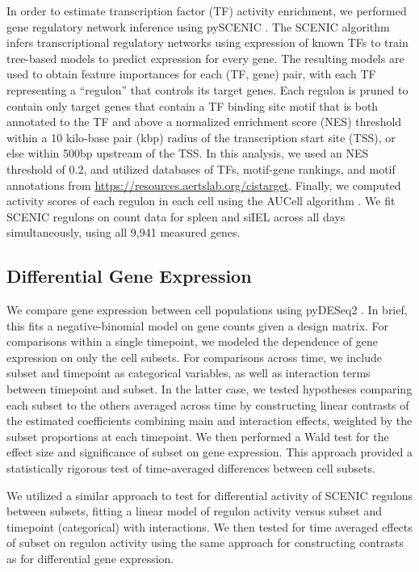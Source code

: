 In order to estimate transcription factor (TF) activity enrichment, we performed gene regulatory network inference using pySCENIC \citep{vandesandeScalableSCENICWorkflow2020}. The SCENIC algorithm \citep{aibarSCENICSinglecellRegulatory2017} infers transcriptional regulatory networks using expression of known TFs to train tree-based models to predict expression for every gene. The resulting models are used to obtain feature importances for each (TF, gene) pair, with each TF representing a ``regulon'' that controls its target genes. Each regulon is pruned to contain only target genes that contain a TF binding site motif that is both annotated to the TF and above a normalized enrichment score (NES) threshold within a 10 kilo-base pair (kbp) radius of the transcription start site (TSS), or else within 500bp upstream of the TSS. In this analysis, we used an NES threshold of 0.2, and utilized databases of TFs, motif-gene rankings, and motif annotations from \url{https://resources.aertslab.org/cistarget}. Finally, we computed activity scores of each regulon in each cell using the AUCell algorithm \citep{aibarSCENICSinglecellRegulatory2017}. We fit SCENIC regulons on count data for spleen and siIEL across all days simultaneously, using all 9,941 measured genes.

\subsection{Differential Gene Expression}

We compare gene expression between cell populations using pyDESeq2 \citep{muzellecPyDESeq2PythonPackage2023}. In brief, this fits a negative-binomial model on gene counts given a design matrix. For comparisons within a single timepoint, we modeled the dependence of gene expression on only the cell subsets. For comparisons across time, we include subset and timepoint as categorical variables, as well as interaction terms between timepoint and subset. In the latter case, we tested hypotheses comparing each subset to the others averaged across time by constructing linear contrasts of the estimated coefficients combining main and interaction effects, weighted by the subset proportions at each timepoint. We then performed a Wald test for the effect size and significance of subset on gene expression. This approach provided a statistically rigorous test of time-averaged differences between cell subsets.

We utilized a similar approach to test for differential activity of SCENIC regulons between subsets, fitting a linear model of regulon activity versus subset and timepoint (categorical) with interactions. We then tested for time averaged effects of subset on regulon activity using the same approach for constructing contrasts as for differential gene expression.

